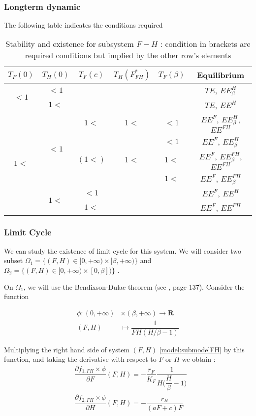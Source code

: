 \documentclass{article}
\begin{document}
\subsubsection{Longterm dynamic}
The following table indicates the conditions required 
\begin{table}[ht]
\centering
\caption{\centering Stability and existence for subsystem $F-H$ : condition in brackets are required conditions but implied by the other row's elements}
\begin{tabular}{c|c|c|c|c|c}
$T_F(0)$ & $T_H(0)$ & $T_F(c)$ & $T_H(F^*_{FH})$ & $T_F(\beta)$ & Equilibrium \\
\hline
\multirow{2}{*}{$<1$} & $<1$ & & & & $TE$, $EE^H_\beta$ \\
 & $1<$ & & & & $TE$, $EE^H$ \\
 \hline
 \multirow{6}{*}{$1<$}& \multirow{4}{*}{$<1$} & $1<$ & $1<$ & $<1$ & $EE^F$, $EE^H_\beta$, $EE^{FH}$ \\
 & & & & $<1$ & $EE^F$, $EE^H_\beta$ \\
 \cline{3-6}
  & & $(1<)$ & $1<$ & $1<$& $EE^F$, $EE^{FH}_\beta$, $EE^{FH}$ \\
 & & & & $1<$ & $EE^F$, $EE^{FH}_\beta$ \\
 \cline{2-6}
 & \multirow{2}{*}{$1<$} &$<1$ & & & $EE^F$, $EE^H$ \\ 
 & &  $1<$ & & &  $EE^{F}$, $EE^{FH}$ \\\hline
\end{tabular}
\end{table}

\subsubsection{Limit Cycle}
We can study the existence of limit cycle for this system. We will consider two subset $\Omega_1 = \{(F,H) \in [0, +\infty) \times [\beta, +\infty)\}$ and $\Omega_2 = \{(F,H) \in [0, +\infty) \times [0, \beta])\}$ . 


On $\Omega_1$, we will use the Bendixson-Dulac theorem (see \cite{farkas_1994_periodic}, page 137). Consider the function

\begin{align}
\phi : (0, +\infty) &\times (\beta, +\infty) \rightarrow \mathbf{R} \label{limit cylce:phiFH}
\\
\nonumber
(F,H) & \mapsto \dfrac{1}{F H (H/\beta - 1)}
\end{align}

Multiplying the right hand side of system $(F,H)$ \eqref{model:submodelFH} by this function, and taking the derivative with respect to $F$ or $H$ we obtain :
\begin{subequations}
\begin{align}
&\dfrac{\partial f_{1,FH} \times \phi}{\partial F}(F,H) = - \dfrac{r_F}{K_F} \dfrac{1}{H \big(\dfrac{H}{\beta}-1 \big)} \\
&\dfrac{\partial f_{2,FH} \times \phi}{\partial H}(F,H) = - \dfrac{r_H}{(aF + c) F}
\end{align}
\end{subequations}
\end{document}
